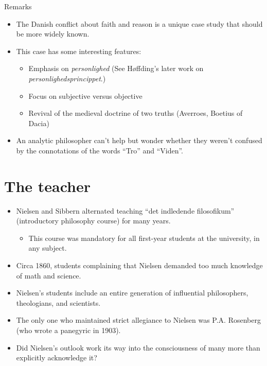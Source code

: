\documentclass[ignorenonframetext, ]{beamer}
\begin{document}
\begin{frame}{Remarks}

  \begin{itemize}
  \item The Danish conflict about faith and reason is a unique case
    study that should be more widely known.
  \item This case has some interesting features:
    \begin{itemize}
    \item Emphasis on \emph{personlighed} (See Høffding's later work
      on \emph{personlighedsprincippet}.)
    \item Focus on subjective versus objective
    \item Revival of the medieval doctrine of two truths (Averroes,
      Boetius of Dacia)
    \end{itemize}
  \item An analytic philosopher can't help but wonder whether they
    weren't confused by the connotations of the words ``Tro'' and
    ``Viden''.
  \end{itemize}


\end{frame}

\section{The teacher}

\begin{frame}

\begin{itemize}
\item Nielsen and Sibbern alternated teaching ``det indledende
  filosofikum'' (introductory philosophy course) for many years.
  \begin{itemize}
  \item This course was mandatory for all first-year students at the
    university, in any subject.
  \end{itemize}
\item Circa 1860, students complaining that Nielsen demanded too much
  knowledge of math and science.
\end{itemize}
\end{frame}

\begin{frame}

  \begin{itemize}
  \item Nielsen's students include an entire generation of influential
    philosophers, theologians, and scientists.
  \item The only one who maintained strict allegiance to Nielsen was
    P.A. Rosenberg (who wrote a panegyric in 1903).
  \item Did Nielsen's outlook work its way into the consciousness of
    many more than explicitly acknowledge it?
  \end{itemize}

\end{frame}
\end{document}
